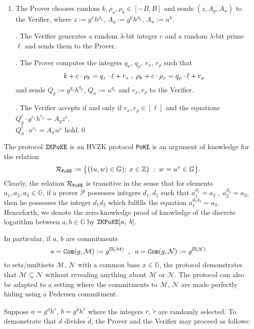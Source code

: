 \documentclass[11pt, lettersize, notitlepage, leqno, footskip=0.6cm]{article}
\newcommand{\bz}{\mathbb Z}
\newcommand{\ttt}{\texttt}
\newcommand{\bG}{\mathbb{G}}
\newcommand{\wti}{\widetilde}
\newcommand{\mc}{\mathcal}
\newcommand{\mb}{\mathbb}
\newcommand{\lam}{\lambda}
\newcommand{\sub}{\subseteq}
\newcommand{\mP}{\mc{P}}
\newcommand{\mcM}{\mc{M}}
\newcommand{\vs}{\vspace{-0.15cm}}
\newcommand{\noin}{\noindent}
\numberwithin{equation}{section}
\begin{document}
\begin{enumerate}[wide, labelwidth=!, labelindent=0pt]\vs \item The Prover chooses random $k, \rho_x, \rho_k\in [-B,B]$ and sends $(z, A_g, A_u)$ to the Verifier, where $z:= g^xh^{\rho_x}$, $A_g:= g^kh^{\rho_k}$, $A_u:= u^k$.

\noin 2. The Verifier generates a random $\lam$-bit integer $c$ and a random $\lam$-bit prime $\ell$ and sends them to the Prover.

\noin 3. The Prover computes the integers $q_x$, $q_{\rho}$, $r_x$, $r_{\rho}$ such that \vs $$k+c\cdot \rho_k = q_x\cdot \ell + r_x\;,\; \rho_k+c\cdot \rho_x = q_{\rho}\cdot \ell + r_{\rho} \vs $$ and sends $Q_g:= g^{q_x}h^{q_{\rho}}$, $Q_u:= u^{q_x}$ and $r_x,r_{\rho}$ to the Verifier.

\noin 4. The Verifier accepts if and only if $r_x,r_{\rho}\in [\ell]$ and the equations $Q_g^{\ell}\cdot g^{r_x}h^{r_{\rho}} = A_gz^c$,\\ $Q_u^{\ell}\cdot u^{r_x} = A_u w^{c}  $ hold.\qed \end{enumerate}

\noin The protocol $\tt{ZKPoKE}$ is an HVZK protocol \verb|PoKE| is an argument of knowledge for the relation \vs $$\mc{R}_{\tt{PoKE}}:= \big\{\big((u,w)\in \bG);\; x\in \bz\big)\;:\; w = u^x \in \bG  \big\}.$$ Clearly, the relation $\mc{R}_{\tt{PoKE}}$ is transitive in the sense that for elements $a_1,a_2,a_3\in\mb{G}$, if a prover $\mP$ possesses integers $d_1,d_2$ such that $a_1^{d_1} = a_2\;,\;a_2^{d_2} = a_3$, then he possesses the integer $d_1d_2$ which fulfills the equation $a_1^{d_1d_2} = a_3$. Henceforth, we denote the zero-knowledge proof of knowledge of the discrete logarithm between $a,b\in\mb{G}$ by $\verb|ZKPoKE|[a,\;b]$.

In particular, if $a$, $b$ are commitments \vs $$ a = \ttt{Com}(g, \mc{M}) := g^{\Pi(\mcM)}\;\;,\;\;a = \ttt{Com}(g, \mc{N}) := g^{\Pi(\mc{N})}  \vs $$ to sets/multisets $\mcM$, $\mc{N}$ with  a common base $x\in\bG$, the protocol demonstrates that $\mcM\sub \mc{N}$ without revealing anything about $\mcM$ or $\mc{N}$. The protocol can also be adapted to a setting where the commitments to $\mc{M}$, $\mc{N}$ are made perfectly hiding using a Pedersen commitment.

Suppose $a = g^{d}h^{r}$, $b = g^{\wti{d}}h^{\wti{r}}$ where the integers $r$, $\wti{r}$ are randomly selected. To demonstrate that $d$ divides $\wti{d}$, the Prover and the Verifier may proceed as follows:\vspace{0.1cm}
\end{document}
